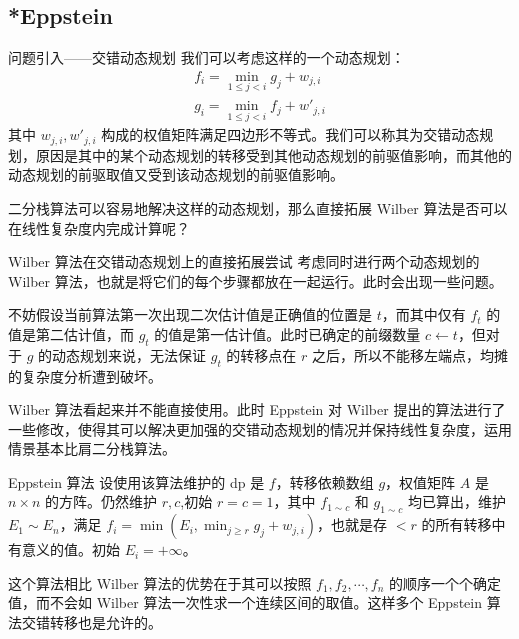 \documentclass{beamer}
\begin{document}
\subsection{*Eppstein}
\begin{frame}{问题引入——交错动态规划}
	我们可以考虑这样的一个动态规划：
	\begin{gather*}
		f_i = \min_{1 \leq j < i} g_j + w_{j,i} \\
		g_i = \min_{1 \leq j < i} f_j + w'_{j,i}
	\end{gather*}
	其中 $w_{j,i},w'_{j,i}$ 构成的权值矩阵满足四边形不等式。我们可以称其为交错动态规划，原因是其中的某个动态规划的转移受到其他动态规划的前驱值影响，而其他的动态规划的前驱取值又受到该动态规划的前驱值影响。
	
	二分栈算法可以容易地解决这样的动态规划，那么直接拓展 Wilber 算法是否可以在线性复杂度内完成计算呢？
\end{frame}
\begin{frame}{Wilber 算法在交错动态规划上的直接拓展尝试}
	考虑同时进行两个动态规划的 Wilber 算法，也就是将它们的每个步骤都放在一起运行。此时会出现一些问题。
	
	不妨假设当前算法第一次出现二次估计值是正确值的位置是 $t$，而其中仅有 $f_t$ 的值是第二估计值，而 $g_t$ 的值是第一估计值。此时已确定的前缀数量 $c \leftarrow t$，但对于 $g$ 的动态规划来说，无法保证 $g_t$ 的转移点在 $r$ 之后，所以不能移左端点，均摊的复杂度分析遭到破坏。\pause
	
	Wilber 算法看起来并不能直接使用。此时 Eppstein 对 Wilber 提出的算法进行了一些修改，使得其可以解决更加强的交错动态规划的情况并保持线性复杂度，运用情景基本比肩二分栈算法。
	
\end{frame}
\begin{frame}{Eppstein 算法}
	设使用该算法维护的 dp 是 $f$，转移依赖数组 $g$，权值矩阵 $A$ 是 $n \times n$ 的方阵。仍然维护 $r,c$,初始 $r = c = 1$，其中 $f_{1 \sim c}$ 和 $g_{1 \sim c}$ 均已算出，维护 $E_1 \sim E_n$，满足 $f_i = \min(E_i , \min_{j \geq r} g_j+w_{j,i})$，也就是存 $<r$ 的所有转移中有意义的值。初始 $E_i = +\infty$。
	
	这个算法相比 Wilber 算法的优势在于其可以按照 $f_1,f_2,\cdots,f_n$ 的顺序一个个确定值，而不会如 Wilber 算法一次性求一个连续区间的取值。这样多个 Eppstein 算法交错转移也是允许的。
\end{frame}
\end{document}
